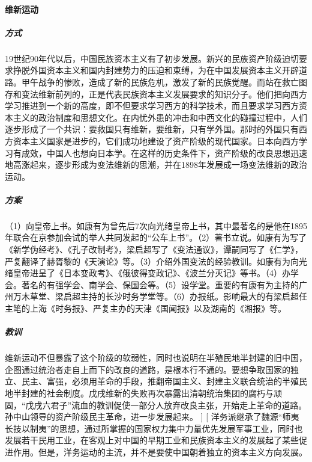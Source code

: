 \begin{enumerate}
		\paragraph{维新运动}
			\subparagraph{方式}  19世纪90年代以后，中国民族资本主义有了初步发展。新兴的民族资产阶级迫切要求挣脱外国资本主义和国内封建势力的压迫和束缚，为在中国发展资本主义开辟道路。甲午战争的惨败，造成了新的民族危机，激发了新的民族觉醒。而站在救亡图存和变法维新前列的，正是代表民族资本主义发展要求的知识分子。他们把向西方学习推进到一个新的高度，即不但要求学习西方的科学技术，而且要求学习西方资本主义的政治制度和思想文化。在内忧外患的冲击和中西文化的碰撞过程中，人们逐步形成了一个共识：要救国只有维新，要维新，只有学外国。那时的外国只有西方资本主义国家是进步的，它们成功地建设了资产阶级的现代国家。日本向西方学习有成效，中国人也想向日本学。在这样的历史条件下，资产阶级的改良思想迅速地高涨起来，逐步形成为变法维新的思潮，并在1898年发展成一场变法维新的政治运动。
			\subparagraph{方案} （1）向皇帝上书。如康有为曾先后7次向光绪皇帝上书，其中最著名的是他在1895年联合在京参加会试的举人共同发起的“公车上书”。（2）著书立说。如康有为写了《新学伪经考》、《孔子改制考》，梁启超写了《变法通议》，谭嗣同写了《仁学》，严复翻译了赫胥黎的《天演论》等。（3）介绍外国变法的经验教训。如康有为向光绪皇帝进呈了《日本变政考》、《俄彼得变政记》、《波兰分灭记》等书。（4）办学会。著名的有强学会、南学会、保国会等。（5）设学堂。重要的有康有为主持的广州万木草堂、梁启超主持的长沙时务学堂等。（6）办报纸。影响最大的有梁启超任主笔的上海《时务报》、严复主办的天津《国闻报》以及湖南的《湘报》等。
			\subparagraph{教训} 维新运动不但暴露了这个阶级的软弱性，同时也说明在半殖民地半封建的旧中国，企图通过统治者走自上而下的改良的道路，是根本行不通的。要想争取国家的独立、民主、富强，必须用革命的手段，推翻帝国主义、封建主义联合统治的半殖民地半封建的社会制度。戊戌维新的失败再次暴露出清朝统治集团的腐朽与顽固，“戊戌六君子”流血的教训促使一部分人放弃改良主张，开始走上革命的道路。孙中山领导的资产阶级民主革命，进一步发展起来。
	]
	\question[试述近代以来中国人学习西方的努力屡遭失败的原因。]
	\unsolve
	\question[为什么说太平天国起义是中国旧式农民战争的最高峰？]
	\question[从现代化的视角论述洋务运动在中国现代化进程中的作用。]
	\ans[
		洋务派继承了魏源“师夷长技以制夷”的思想，通过所掌握的国家权力集中力量优先发展军事工业，同时也发展若干民用工业，在客观上对中国的早期工业和民族资本主义的发展起了某些促进作用。但是，洋务运动的主流，并不是要使中国朝着独立的资本主义方向发展。\par

\end{enumerate}
